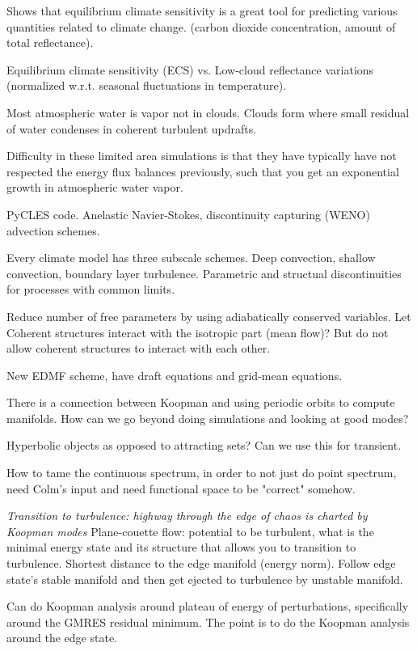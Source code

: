 \begin{description}
{\begin{description}
Shows that equilibrium climate sensitivity is a great tool for predicting
various quantities related to climate change. (carbon dioxide concentration, amount of total
reflectance).

Equilibrium climate sensitivity (ECS) vs. Low-cloud reflectance variations
(normalized w.r.t. seasonal fluctuations in temperature).

Most atmospheric water is vapor not in clouds.
Clouds form where small residual of water condenses in coherent turbulent updrafts.

Difficulty in these limited area simulations is that they have typically have not
respected the energy flux balances previously, such that you get an exponential
growth in atmospheric water vapor.

PyCLES code.
Anelastic Navier-Stokes, discontinuity capturing (WENO) advection schemes.

Every climate model has three subscale schemes. Deep convection, shallow convection,
boundary layer turbulence. Parametric and structual discontinuities for processes with
common limits.

Reduce number of free parameters by using adiabatically conserved variables.
Let Coherent structures interact with the isotropic part (mean flow)? But do
not allow coherent structures to interact with each other.

New EDMF scheme, have draft equations and grid-mean equations.

\item[Koopman Coalition]
There is a connection between Koopman and using periodic orbits to
compute manifolds. How can we go beyond doing simulations and
looking at good modes?

Hyperbolic objects as opposed to attracting sets? Can we use
this for transient.

How to tame the continuous spectrum, in order to not just
do point spectrum, need Colm's input and need
functional space to be "correct" somehow.

\textit{Transition to turbulence: highway through the edge of chaos is charted
by Koopman modes}
Plane-couette flow: potential to be turbulent, what is the minimal energy state
and its structure that allows you to transition to turbulence.
Shortest distance to the edge manifold (energy norm). Follow edge state's stable
manifold and then get ejected to turbulence by unstable manifold.

Can do Koopman analysis around plateau of energy of perturbations, specifically
around the GMRES residual minimum. The point is to do the Koopman analysis
around the edge state.


\end{description}}
\end{description}
